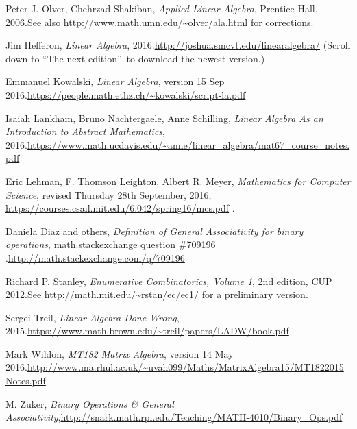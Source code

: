 \documentclass[numbers=enddot,12pt,final,onecolumn,notitlepage]{scrartcl}%
\theoremstyle{definition}
\begin{document}
\begin{thebibliography}{9999999999}
Peter J. Olver, Chehrzad Shakiban, \textit{Applied
Linear Algebra}, Prentice Hall, 2006.\newline See also
\url{http://www.math.umn.edu/~olver/ala.html} for corrections.

Jim Hefferon, \textit{Linear Algebra},
2016.\newline\url{http://joshua.smcvt.edu/linearalgebra/} (Scroll down to
\textquotedblleft The next edition\textquotedblright\ to download the newest version.)

Emmanuel Kowalski, \textit{Linear Algebra},
version 15 Sep 2016.\newline\url{https://people.math.ethz.ch/~kowalski/script-la.pdf}

Isaiah Lankham, Bruno Nachtergaele, Anne
Schilling, \textit{Linear Algebra As an Introduction to Abstract Mathematics},
2016.\newline\url{https://www.math.ucdavis.edu/~anne/linear_algebra/mat67_course_notes.pdf}

Eric Lehman, F. Thomson Leighton, Albert R. Meyer,
\textit{Mathematics for Computer Science}, revised Thursday 28th September,
2016, \newline\url{https://courses.csail.mit.edu/6.042/spring16/mcs.pdf} .

Daniela Diaz and others, \textit{Definition of
General Associativity for binary operations}, math.stackexchange question
\#709196 .\newline\url{http://math.stackexchange.com/q/709196}

Richard P. Stanley, \textit{Enumerative
Combinatorics, Volume 1}, 2nd edition, CUP 2012.\newline See
\url{http://math.mit.edu/~rstan/ec/ec1/} for a preliminary version.

Sergei Treil, \textit{Linear Algebra Done Wrong},
2015.\newline\url{https://www.math.brown.edu/~treil/papers/LADW/book.pdf}

Mark Wildon, \textit{MT182 Matrix Algebra},
version 14 May 2016.\newline\url{http://www.ma.rhul.ac.uk/~uvah099/Maths/MatrixAlgebra15/MT1822015Notes.pdf}

M. Zuker, \textit{Binary Operations \& General
Associativity},\newline\url{http://snark.math.rpi.edu/Teaching/MATH-4010/Binary_Ops.pdf}
\end{thebibliography}
\end{document}
